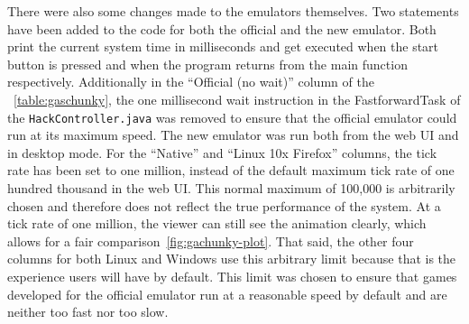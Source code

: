 There were also some changes made to the emulators themselves.
Two statements have been added to the code for both the official and the new emulator.
Both print the current system time in milliseconds and get executed when the start button is pressed and when the program returns from the main function respectively.
Additionally in the ``Official (no wait)'' column of the ~\cref{table:gaschunky}, the one millisecond wait instruction in the FastforwardTask of the \verb+HackController.java+ was removed to ensure that the official emulator could run at its maximum speed.
The new emulator was run both from the web UI and in desktop mode.
For the ``Native'' and ``Linux 10x Firefox'' columns, the tick rate has been set to one million, instead of the default maximum tick rate of one hundred thousand in the web UI.
This normal maximum of 100,000 is arbitrarily chosen and therefore does not reflect the true performance of the system.
At a tick rate of one million, the viewer can still see the animation clearly, which allows for a fair comparison~\ref{fig:gachunky-plot}.
That said, the other four columns for both Linux and Windows use this arbitrary limit because that is the experience users will have by default.
This limit was chosen to ensure that games developed for the official emulator run at a reasonable speed by default and are neither too fast nor too slow.

